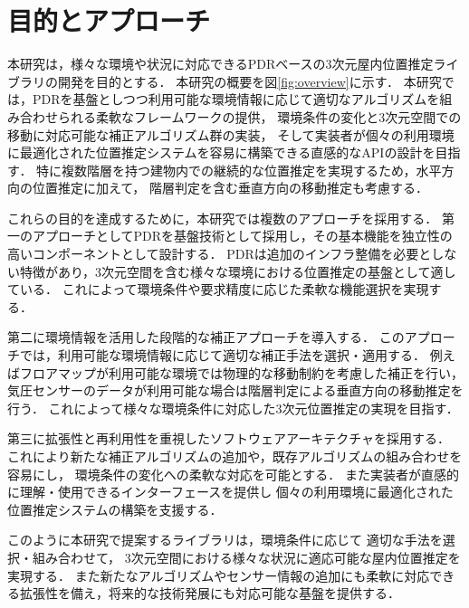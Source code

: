 

\section{目的とアプローチ}

本研究は，様々な環境や状況に対応できるPDRベースの3次元屋内位置推定ライブラリの開発を目的とする．
本研究の概要を図\ref{fig:overview}に示す．
本研究では，PDRを基盤としつつ利用可能な環境情報に応じて適切なアルゴリズムを組み合わせられる柔軟なフレームワークの提供，
環境条件の変化と3次元空間での移動に対応可能な補正アルゴリズム群の実装，
そして実装者が個々の利用環境に最適化された位置推定システムを容易に構築できる直感的なAPIの設計を目指す．
特に複数階層を持つ建物内での継続的な位置推定を実現するため，水平方向の位置推定に加えて，
階層判定を含む垂直方向の移動推定も考慮する．

これらの目的を達成するために，本研究では複数のアプローチを採用する．
第一のアプローチとしてPDRを基盤技術として採用し，その基本機能を独立性の高いコンポーネントとして設計する．
PDRは追加のインフラ整備を必要としない特徴があり，3次元空間を含む様々な環境における位置推定の基盤として適している．
これによって環境条件や要求精度に応じた柔軟な機能選択を実現する．

第二に環境情報を活用した段階的な補正アプローチを導入する．
このアプローチでは，利用可能な環境情報に応じて適切な補正手法を選択・適用する．
例えばフロアマップが利用可能な環境では物理的な移動制約を考慮した補正を行い，
気圧センサーのデータが利用可能な場合は階層判定による垂直方向の移動推定を行う．
これによって様々な環境条件に対応した3次元位置推定の実現を目指す．

第三に拡張性と再利用性を重視したソフトウェアアーキテクチャを採用する．
これにより新たな補正アルゴリズムの追加や，既存アルゴリズムの組み合わせを容易にし，
環境条件の変化への柔軟な対応を可能とする．
また実装者が直感的に理解・使用できるインターフェースを提供し
個々の利用環境に最適化された位置推定システムの構築を支援する．

このように本研究で提案するライブラリは，環境条件に応じて
適切な手法を選択・組み合わせて，
3次元空間における様々な状況に適応可能な屋内位置推定を実現する．
また新たなアルゴリズムやセンサー情報の追加にも柔軟に対応できる拡張性を備え，将来的な技術発展にも対応可能な基盤を提供する．


